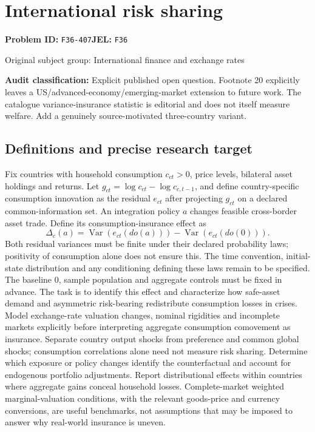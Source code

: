 \documentclass[11pt,a4paper]{article}
\begin{document}
\section*{International risk sharing}
\textbf{Problem ID:} \texttt{F36-407}\quad \textbf{JEL:} \texttt{F36}\par
\label{problem:OP-0335}
{\sffamily\small\color{muted}Original subject group: International finance and exchange rates\par}
\label{definitions:problem:30007617}
\textbf{Audit classification:} Explicit published open question. Footnote 20 explicitly leaves a US/advanced-economy/emerging-market extension to future work. The catalogue variance-insurance statistic is editorial and does not itself measure welfare. Add a genuinely source-motivated three-country variant.
\subsection*{Definitions and precise research target}
Fix countries with household consumption \(c_{ct}>0\), price levels, bilateral asset holdings and returns. Let \(g_{ct}=\log c_{ct}-\log c_{c,t-1}\), and define country-specific consumption innovation as the residual \(e_{ct}\) after projecting \(g_{ct}\) on a declared common-information set. An integration policy \(a\) changes feasible cross-border asset trade. Define its consumption-insurance effect as
\[\Delta_c(a)=\operatorname{Var}(e_{ct}(do(a)))-\operatorname{Var}(e_{ct}(do(0))).\]
Both residual variances must be finite under their declared probability laws; positivity of consumption alone does not ensure this. The time convention, initial-state distribution and any conditioning defining these laws remain to be specified. The baseline \(0\), sample population and aggregate controls must be fixed in advance. The task is to identify this effect and characterize how safe-asset demand and asymmetric risk-bearing redistribute consumption losses in crises. Model exchange-rate valuation changes, nominal rigidities and incomplete markets explicitly before interpreting aggregate consumption comovement as insurance. Separate country output shocks from preference and common global shocks; consumption correlations alone need not measure risk sharing. Determine which exposure or policy changes identify the counterfactual and account for endogenous portfolio adjustments. Report distributional effects within countries where aggregate gains conceal household losses. Complete-market weighted marginal-valuation conditions, with the relevant goods-price and currency conversions, are useful benchmarks, not assumptions that may be imposed to answer why real-world insurance is uneven.
\end{document}
